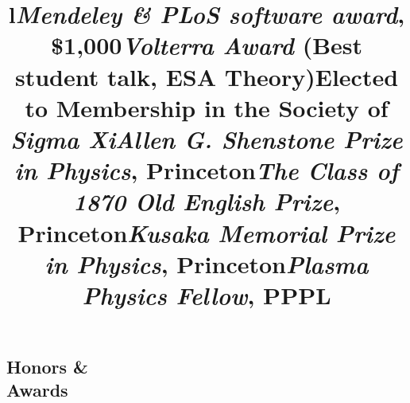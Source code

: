 \documentclass[margin]{res}
\begin{document}
\begin{resume}
\section{Honors \& \\ Awards}
\begin{format}
\title{l}\\
\body
\end{format}


\title{\emph{Mendeley \& PLoS software award}, \$1,000}
\begin{position} \vspace{-.7cm} \end{position}

\title{\emph{Volterra Award} (Best student talk, ESA Theory)}
\begin{position} \vspace{-.7cm} \end{position}

\title{Elected to Membership in the Society of \emph{Sigma Xi}}
\begin{position}   \vspace{-.7cm} \end{position}

\title{\emph{Allen G. Shenstone Prize in Physics}, Princeton}
\begin{position}   \vspace{-.7cm} \end{position}

\title{\emph{The Class of 1870 Old English Prize},  Princeton}
\begin{position}   \vspace{-.7cm} \end{position}

\title{\emph{Kusaka Memorial Prize in Physics}, Princeton}
\begin{position}   \vspace{-.7cm} \end{position}

\title{\emph{Plasma Physics Fellow},  PPPL }
\begin{position}   \vspace{-.7cm} \end{position}



\end{resume}
\end{document}
